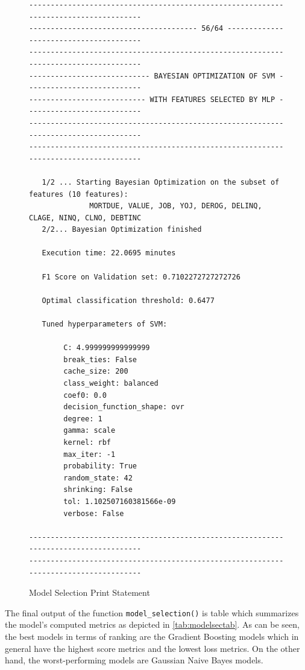 \begin{figure}[H]
    \centering\caption{Model Selection Print Statement}
    \label{fig:modselprint}

{\fontsize{8.8}{11}\selectfont 
\begin{verbatim}
-------------------------------------------------------------------------------------
--------------------------------------- 56/64 ---------------------------------------
-------------------------------------------------------------------------------------
---------------------------- BAYESIAN OPTIMIZATION OF SVM ---------------------------
--------------------------- WITH FEATURES SELECTED BY MLP ---------------------------
-------------------------------------------------------------------------------------
------------------------------------------------------------------------------------- 
    
   1/2 ... Starting Bayesian Optimization on the subset of features (10 features):
              MORTDUE, VALUE, JOB, YOJ, DEROG, DELINQ, CLAGE, NINQ, CLNO, DEBTINC
   2/2... Bayesian Optimization finished 
    
   Execution time: 22.0695 minutes 
   
   F1 Score on Validation set: 0.7102272727272726 
    
   Optimal classification threshold: 0.6477 
    
   Tuned hyperparameters of SVM: 
    
        C: 4.999999999999999
        break_ties: False
        cache_size: 200
        class_weight: balanced
        coef0: 0.0
        decision_function_shape: ovr
        degree: 1
        gamma: scale
        kernel: rbf
        max_iter: -1
        probability: True
        random_state: 42
        shrinking: False
        tol: 1.102507160381566e-09
        verbose: False

-------------------------------------------------------------------------------------
------------------------------------------------------------------------------------- 
\end{verbatim}
}
\vspace{0em}
\end{figure}



The final output of the function \lstinline{model_selection()} is table which summarizes the model's computed metrics as depicted in \autoref{tab:modelsectab}. As can be seen, the best models in terms of ranking are the Gradient Boosting models which in general have the highest score metrics and the lowest loss metrics. On the other hand, the worst-performing models are Gaussian Naive Bayes models.


